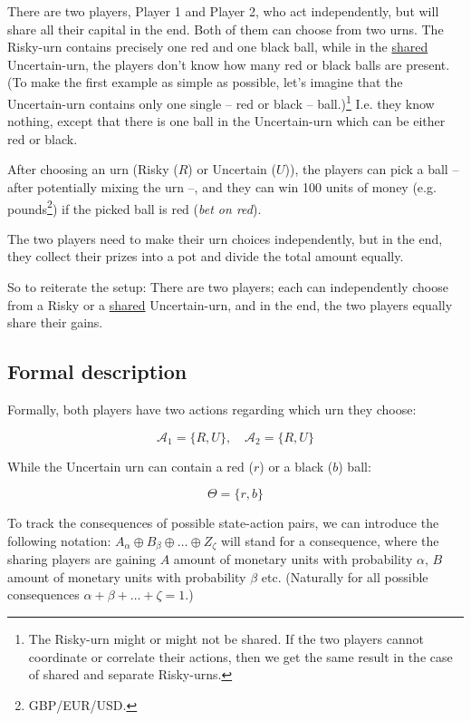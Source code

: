 \documentclass{article}
\theoremstyle{definition}
\begin{document}
There are two players, Player 1 and Player 2, who act independently, but will share all their capital in the end.
Both of them can choose from two urns. The Risky-urn contains precisely one red and one black ball, while in the \underline{shared} Uncertain-urn, the players don't know how many red or black balls are present.
(To make the first example as simple as possible, let's imagine that the Uncertain-urn contains only one single -- red or black -- ball.)\footnote{The Risky-urn might or might not be shared. If the two players cannot coordinate or correlate their actions, then we get the same result in the case of shared and separate Risky-urns.} I.e. they know nothing, except that there is one ball in the Uncertain-urn which can be either red or black.

After choosing an urn (Risky ($R$) or Uncertain ($U$)), the players can pick a ball -- after potentially mixing the urn --, and they can win 100 units of money (e.g. pounds\footnote{GBP/EUR/USD.}) if the picked ball is red (\emph{bet on red}).

The two players need to make their urn choices independently, but in the end, they collect their prizes into a pot and divide the total amount equally.

So to reiterate the setup:
There are two players; each can independently choose from a Risky or a \underline{shared} Uncertain-urn, and in the end, the two players equally share their gains.

\subsection{Formal description}

Formally, both players have two actions regarding which urn they choose:

\begin{equation}
    \mathcal{A}_1 = \{ R, U \}, \quad
    \mathcal{A}_2 = \{ R, U \}
\end{equation}

While the Uncertain urn can contain a red ($r$) or a black ($b$) ball:

\begin{equation}
    \Theta = \{ r, b \}
\end{equation}

To track the consequences of possible state-action pairs, we can introduce the following notation:
$A_{\alpha} \oplus B_\beta \oplus \dots \oplus Z_\zeta$ will stand for a consequence, where the sharing players are gaining $A$ amount of monetary units with probability $\alpha$, $B$ amount of monetary units with probability $\beta$ etc. (Naturally for all possible consequences $\alpha + \beta + \dots + \zeta = 1$.)
\end{document}
